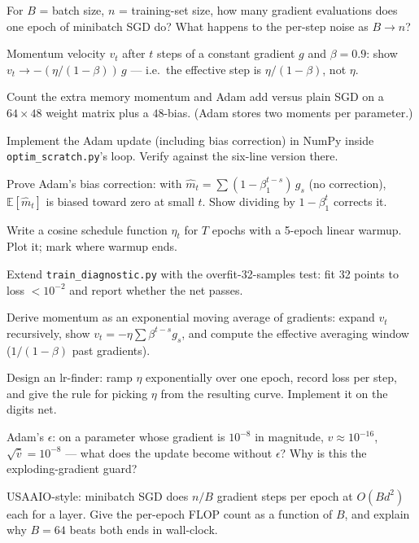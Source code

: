 \begin{exercise}[{[easy]}]
For $B$ = batch size, $n$ = training-set size, how many gradient
evaluations does one epoch of minibatch SGD do? What happens to the
per-step noise as $B\to n$?
\end{exercise}
\begin{exercise}[{[easy]}]
Momentum velocity $v_t$ after $t$ steps of a constant gradient $g$
and $\beta=0.9$: show $v_t\to -(\eta/(1-\beta))\,g$ --- i.e.\ the
effective step is $\eta/(1-\beta)$, not $\eta$.
\end{exercise}
\begin{exercise}[{[easy]}]
Count the extra memory momentum and Adam add versus plain SGD on a
$64\times48$ weight matrix plus a $48$-bias. (Adam stores two moments
per parameter.)
\end{exercise}
\begin{exercise}[{[medium]}]
Implement the Adam update (including bias correction) in NumPy inside
\texttt{optim\_scratch.py}'s loop. Verify against the six-line version
there.
\end{exercise}
\begin{exercise}[{[medium]}]
Prove Adam's bias correction: with $\hat m_t=\sum (1-\beta_1^{t-s})\,
g_s$ (no correction), $\mathbb E[\hat m_t]$ is biased toward zero at
small $t$. Show dividing by $1-\beta_1^t$ corrects it.
\end{exercise}
\begin{exercise}[{[medium]}]
Write a cosine schedule function $\eta_t$ for $T$ epochs with a
5-epoch linear warmup. Plot it; mark where warmup ends.
\end{exercise}
\begin{exercise}[{[medium]}]
Extend \texttt{train\_diagnostic.py} with the overfit-32-samples test:
fit 32 points to loss $<10^{-2}$ and report whether the net passes.
\end{exercise}
\begin{exercise}[{[hard]}]
Derive momentum as an exponential moving average of gradients: expand
$v_t$ recursively, show $v_t=-\eta\sum \beta^{t-s}g_s$, and compute
the effective averaging window ($1/(1-\beta)$ past gradients).
\end{exercise}
\begin{exercise}[{[hard]}]
Design an lr-finder: ramp $\eta$ exponentially over one epoch, record
loss per step, and give the rule for picking $\eta$ from the resulting
curve. Implement it on the digits net.
\end{exercise}
\begin{exercise}[{[hard]}]
Adam's $\epsilon$: on a parameter whose gradient is $10^{-8}$ in
magnitude, $\hat v\approx10^{-16}$, $\sqrt{\hat v}=10^{-8}$ ---
what does the update become without $\epsilon$? Why is this the
exploding-gradient guard?
\end{exercise}
\begin{exercise}[{[hard]}]
USAAIO-style: minibatch SGD does $n/B$ gradient steps per epoch at
$O(Bd^2)$ each for a layer. Give the per-epoch FLOP count as a
function of $B$, and explain why $B=64$ beats both ends in wall-clock.
\end{exercise}

